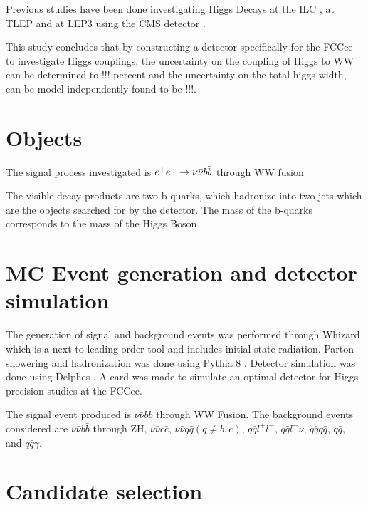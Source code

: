 \documentclass[preprintnumbers,nofootinbib,noshowpacs,eqsecnum,prd,superscriptaddress,letterpaper]{revtex4}
\begin{document}
Previous studies have been done investigating Higgs Decays at the ILC \cite{Higgs ILC}, at TLEP \cite{TLEP} and at LEP3 using the CMS detector \cite{lep3}.

This study concludes that by constructing a detector specifically for the FCCee to investigate Higgs couplings, the uncertainty on the coupling of Higgs to WW can be determined to !!! percent and the uncertainty on the total higgs width, can be model-independently found to be !!!.

\section{Objects}
\label{sec:samples}

The signal process investigated is $e^+e^-\rightarrow\nu\bar{\nu} b\bar{b}$ through WW fusion 


The visible decay products are two b-quarks, which hadronize into two jets which are the objects searched for by the detector. The mass of the b-quarks corresponds to the mass of the Higgs Boson



\section{MC Event generation and detector simulation}
\label{sec:samples}

The generation of signal and background events was performed through Whizard \cite{whizard} which is a next-to-leading order tool and includes initial state radiation. Parton showering and hadronization was done using Pythia 8 \cite{pythia}. Detector simulation was done using Delphes \cite{delphes}. A card was made to simulate an optimal detector for Higgs precision studies at the FCCee. 

The signal event produced is $\nu\bar{\nu}b\bar{b}$ through WW Fusion. The background events considered are $\nu\bar{\nu}b\bar{b}$ through ZH, $\nu\bar{\nu}c\bar{c}$, $\nu\bar{\nu}q\bar{q} (q\neq b,c)$, $q\bar{q}l^+l^-$, $q\bar{q}l^-\nu$, $q\bar{q}q\bar{q}$, $q\bar{q}$, and $q\bar{q}\gamma$.  

\section{Candidate selection}
\label{sec:selection}
\end{document}
